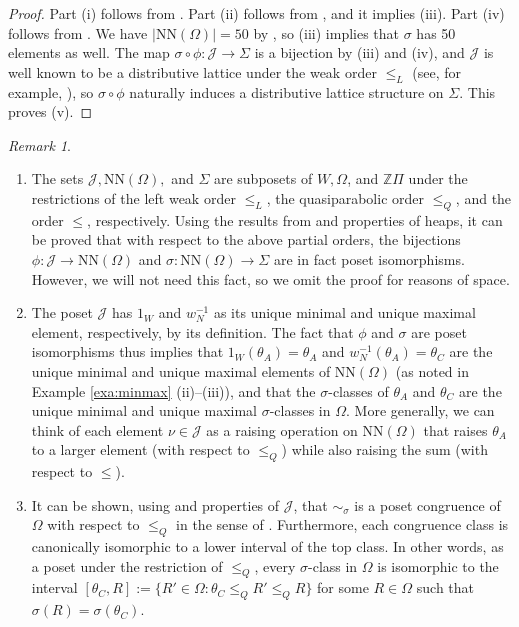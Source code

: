 \documentclass[11pt]{amsart}
\theoremstyle{plain}
\theoremstyle{definition}
\theoremstyle{remark}
\newtheorem{rmk}[theorem]{Remark}
\numberwithin{equation}{section}
\newcommand{\Z}{{\mathbb Z}}
\newcommand{\ra}{\rightarrow}
\newcommand{\wnn}{w_{N}}
\newcommand{\calj}{\mathcal{J}}
\newcommand{\ob}{\Omega}
\newcommand{\nn}{\mathrm{NN}}
\newcommand{\inverse}{^{-1}}
\newcommand{\abs}[1]{\lvert #1 \rvert}
\begin{document}
\begin{proof}
Part (i) follows from \cite[Corollary 4.9 (i)]{gx5}. Part (ii) follows from
\cite[Proposition 5.15 (iii)]{gx5}, and it implies (iii). Part (iv) follows from
\cite[Theorem 5.13 (i)--(ii)]{gx5}. We have $\abs{\nn(\ob)}=50$ by \cite[Theorem
5.16, Proposition 6.9]{gx5}, so (iii) implies that $\sigma$ has 50 elements as
well. The map $\sigma\circ\phi: \calj\ra \Sigma$ is a bijection by (iii) and
(iv), and $\mathcal{J}$ is well known to be a distributive lattice under the
weak order $\le_L$ (see, for example, \cite[Theorem 3.2]{FC}), so
$\sigma\circ\phi$ naturally induces a distributive lattice structure on
$\Sigma$. This proves (v). 
\end{proof}


\begin{rmk}
\label{rmk:isos}
\begin{enumerate}
\item 
The sets $\calj, \nn(\ob),$ and $\Sigma$ are subposets of $W, \ob$, and $\Z\Pi$
under the restrictions of the left weak order $\le_L$, the quasiparabolic order
$\le_Q$, and the order $\le$, respectively. Using the results from
\cite[Proposition 5.12, Theorem 5.13]{gx5} and properties of heaps, it can be
proved that with respect to the above partial orders, the bijections
$\phi:\calj\ra \nn(\ob)$ and $\sigma:\nn(\ob)\ra \Sigma$ are in fact poset
isomorphisms. However, we will not need this fact, so we omit the proof for
reasons of space.

\item The poset $\calj$ has $1_W$ and $\wnn\inverse$
  as its unique minimal and unique maximal element, respectively, by its
  definition. The fact that
  $\phi$ and $\sigma$ are poset isomorphisms thus implies that
  $1_W(\theta_A)=\theta_A$  
  and $\wnn\inverse(\theta_A)=\theta_C$ are the unique minimal and unique
  maximal elements of $\nn(\ob)$ (as noted in Example \ref{exa:minmax}
(ii)--(iii)), and that the $\sigma$-classes of $\theta_A$ and $\theta_C$ are the
unique minimal and unique maximal $\sigma$-classes in $\ob$. More generally, we
can think of each element
 $\nu\in \calj$ as a raising operation on $\nn(\ob)$ that raises $\theta_A$ to
 a larger element (with respect to $\le_Q$) while also raising the sum (with
 respect to $\le$).

\item It can be shown, using \cite[Corollary 4.9, Proposition 5.12]{gx5} and
  properties of $\calj$, that $\sim_\sigma$ is a poset congruence of $\ob$ with
  respect to $\le_Q$ in the sense of \cite[Section 5]{reading02}. Furthermore,
  each congruence class is canonically isomorphic to a lower interval of the top
  class. In other words, as a poset under the restriction of $\le_Q$, every
  $\sigma$-class in $\ob$ is isomorphic to the interval $[\theta_C,R]:=\{R'\in
  \ob: \theta_C\le_Q R'\le_Q R\}$ for some $R\in \ob$ such that
$\sigma(R)=\sigma(\theta_C)$. \end{enumerate} \end{rmk}
\end{document}
